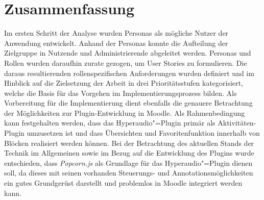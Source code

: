 \section{Zusammenfassung}
Im ersten Schritt der Analyse wurden Personas als mögliche Nutzer der Anwendung entwickelt. Anhand der Personas konnte die Aufteilung der Zielgruppe in Nutzende und Administrierende abgeleitet werden. Personas und Rollen wurden daraufhin zurate gezogen, um User Stories zu formulieren. Die daraus resultierenden rollenspezifischen Anforderungen wurden definiert und im Hinblick auf die Zielsetzung der Arbeit in drei Prioritätsstufen kategorisiert, welche die Basis für das Vorgehen im Implementierungsprozess bilden. Als Vorbereitung für die Implementierung dient ebenfalls die genauere Betrachtung der Möglichkeiten zur Plugin-Entwicklung in Moodle. Als Rahmenbedingung kann festgehalten werden, dass das Hyperaudio"=Plugin primär als Aktivitäten-Plugin umzusetzen ist und dass Übersichten und Favoritenfunktion innerhalb von Blöcken realisiert werden können. Bei der Betrachtung des aktuellen Stands der Technik im Allgemeinen sowie im Bezug auf die Entwicklung des Plugins wurde entschieden, dass \textit{Popcorn.js} als Grundlage für das Hyperaudio"=Plugin dienen soll, da dieses mit seinen vorhanden Steuerungs- und Annotationsmöglichkeiten ein gutes Grundgerüst darstellt und problemlos in Moodle integriert werden kann.